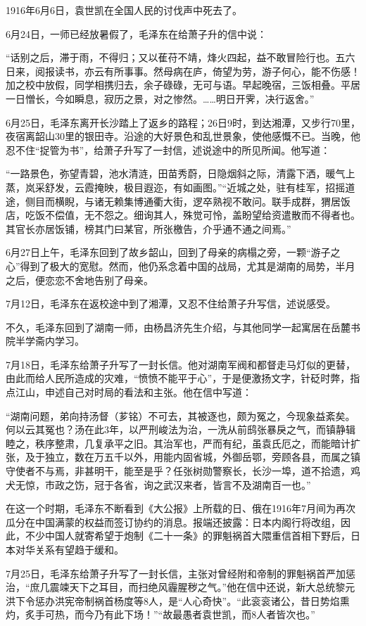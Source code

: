 \documentclass[../../dazhuan.tex]{subfiles}
\begin{document}
1916年6月6日，袁世凯在全国人民的讨伐声中死去了。

6月24日，一师已经放暑假了，毛泽东在给萧子升的信中说：

“话别之后，滞于雨，不得归；又以萑苻不靖，烽火四起，益不敢冒险行也。五六日来，阅报读书，亦云有所事事。然母病在庐，倚望为劳，游子何心，能不伤感！加之校中放假，同学相携归去，余子碌碌，无可与语。早起晚宿，三饭相叠。平居一日憎长，今如瞬息，寂历之景，对之惨然。……明日开霁，决行返舍。”

6月25日，毛泽东离开长沙踏上了返乡的路程；26日9时，到达湘潭，又步行70里，夜宿离韶山30里的银田寺。沿途的大好景色和乱世景象，使他感慨不已。当晚，他忍不住“捉管为书”，给萧子升写了一封信，述说途中的所见所闻。他写道：

“一路景色，弥望青碧，池水清涟，田苗秀蔚，日隐烟斜之际，清露下洒，暖气上蒸，岚采舒发，云霞掩映，极目遐迩，有如画图。”“近城之处，驻有桂军，招摇道途，侧目而横睨，与诸无赖集博通衢大街，逻卒熟视不敢问。联手成群，猬居饭店，吃饭不偿值，无不怨之。细询其人，殊觉可怜，盖盼望给资遣散而不得者也。其官长亦居饭铺，榜其门曰某官，所张檄告，介乎通不通之间焉。”

6月27日上午，毛泽东回到了故乡韶山，回到了母亲的病榻之旁，一颗“游子之心”得到了极大的宽慰。然而，他仍系念着中国的战局，尤其是湖南的局势，半月之后，便恋恋不舍地告别了母亲。

7月12日，毛泽东在返校途中到了湘潭，又忍不住给萧子升写信，述说感受。

不久，毛泽东回到了湖南一师，由杨昌济先生介绍，与其他同学一起寓居在岳麓书院半学斋内学习。

7月18日，毛泽东给萧子升写了一封长信。他对湖南军阀和都督走马灯似的更替，由此而给人民所造成的灾难，“愤愤不能平于心”，于是便激扬文字，针砭时弊，指点江山，申述自己对时局的看法和主张。他在信中写道：

“湖南问题，弟向持汤督（芗铭）不可去，其被逐也，颇为冤之，今现象益紊矣。何以云其冤也？汤在此3年，以严刑峻法为治，一洗从前鸱张暴戾之气，而镇静辑睦之，秩序整肃，几复承平之旧。其治军也，严而有纪，虽袁氏厄之，而能暗计扩张，及于独立，数在万五千以外，用能内固省城，外御岳鄂，旁顾各县，而属之镇守使者不与焉，非甚明干，能至是乎？任张树勋警察长，长沙一埠，道不拾遗，鸡犬无惊，市政之饬，冠于各省，询之武汉来者，皆言不及湖南百一也。”

在这一个时期，毛泽东不断看到《大公报》上所载的日、俄在1916年7月间为再次瓜分在中国满蒙的权益而签订协约的消息。报端还披露：日本内阁行将改组，因此，不少中国人就寄希望于炮制《二十一条》的罪魁祸首大隈重信首相下野后，日本对华关系有望趋于缓和。

7月25日，毛泽东给萧子升写了一封长信，主张对曾经附和帝制的罪魁祸首严加惩治，“庶几震竦天下之耳目，而扫绝风霾腥秽之气。”他在信中还说，新大总统黎元洪下令惩办洪宪帝制祸首杨度等8人，是“人心奇快”。“此衮衮诸公，昔日势焰熏灼，炙手可热，而今乃有此下场！”“故最愚者袁世凯，而8人者皆次也。”
\end{document}

